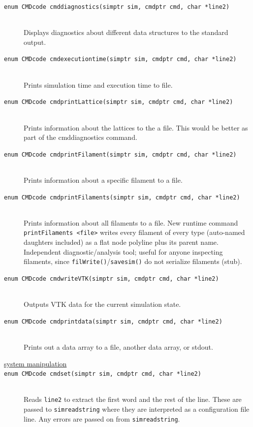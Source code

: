\documentclass {scrbook}
\newcommand {\ttt} {\texttt}
\begin{document}
\begin{description}
\item[\ttt{enum CMDcode cmddiagnostics(simptr sim, cmdptr cmd, char *line2)}]
\hfill \\
Displays diagnostics about different data structures to the standard output.

\item[\ttt{enum CMDcode cmdexecutiontime(simptr sim, cmdptr cmd, char *line2)}]
\hfill \\
Prints simulation time and execution time to file.

\item[\ttt{enum CMDcode cmdprintLattice(simptr sim, cmdptr cmd, char *line2)}]
\hfill \\
Prints information about the lattices to the a file. This would be better as part of the cmddiagnostics command.

\item[\ttt{enum CMDcode cmdprintFilament(simptr sim, cmdptr cmd, char *line2)}]
\hfill \\
Prints information about a specific filament to a file.

\item[\ttt{enum CMDcode cmdprintFilaments(simptr sim, cmdptr cmd, char *line2)}]
\hfill \\
Prints information about all filaments to a file. New runtime command \ttt{printFilaments <file>} writes every filament of every type (auto-named daughters included) as a flat node polyline plus its parent name. Independent diagnostic/analysis tool; useful for anyone inspecting filaments, since \ttt{filWrite()}/\ttt{savesim()} do not serialize filaments (stub).%

\item[\ttt{enum CMDcode cmdwriteVTK(simptr sim, cmdptr cmd, char *line2)}]
\hfill \\
Outputs VTK data for the current simulation state.

\item[\ttt{enum CMDcode cmdprintdata(simptr sim, cmdptr cmd, char *line2)}]
\hfill \\
Prints out a data array to a file, another data array, or stdout.

\item[\underline{system manipulation}]

\item[\ttt{enum CMDcode cmdset(simptr sim, cmdptr cmd, char *line2)}]
\hfill \\
Reads \ttt{line2} to extract the first word and the rest of the line. These are passed to \ttt{simreadstring} where they are interpreted as a configuration file line. Any errors are passed on from \ttt{simreadstring}.


\end{description}
\end{document}
